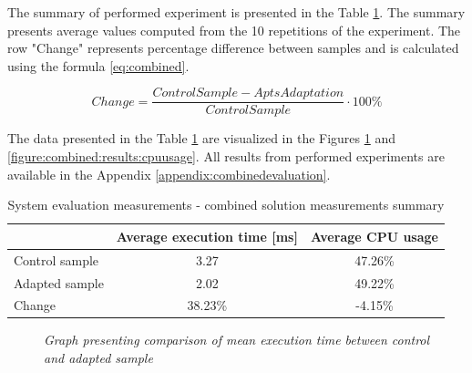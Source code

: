 \documentclass[12pt,a4paper]{article}
\begin{document}
The summary of performed experiment is presented in the Table \ref{table:combined:results:summary}. The summary presents average values computed from the 10 repetitions of the experiment. The row "Change" represents percentage difference between samples and is calculated using the formula \eqref{eq:combined}.

\begin{equation} \label{eq:combined}
Change = \frac{ControlSample - AptsAdaptation}{ControlSample}\cdot 100\%
\end{equation}

The data presented in the Table \ref{table:combined:results:summary} are visualized in the Figures \ref{figure:combined:results:executiontime} and \ref{figure:combined:results:cpuusage}. All results from performed experiments are available in the Appendix \ref{appendix:combinedevaluation}.

\begin{table}[ht]
\begin{center}
\begin{tabular}{l|c|c}
    & \textbf{Average execution time [ms]} & \textbf{Average CPU usage} \\ \hline
    Control	sample	  &3.27     & 47.26\% \\ 
    Adapted sample	  &2.02	    & 49.22\% \\ \hline
    Change		      &38.23\%	& -4.15\%
\end{tabular}
\end{center}
\caption{System evaluation measurements - combined solution measurements summary} \label{table:combined:results:summary}
\end{table}

\begin{figure}[!htb]
\centering
{}
\caption{\textit{Graph presenting comparison of mean execution time between control and adapted sample}} \label{figure:combined:results:executiontime}
\end{figure}
\end{document}
